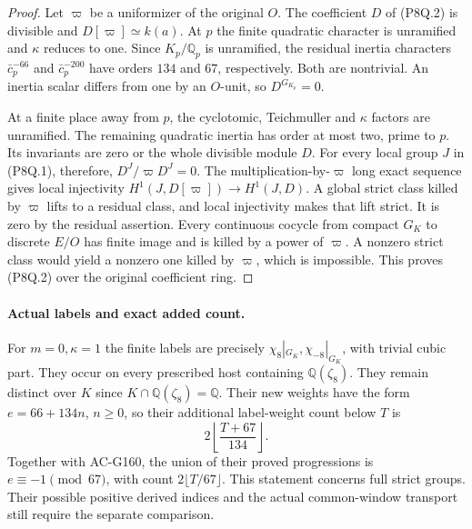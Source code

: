 \begin{proof}
Let $\varpi$ be a uniformizer of the original $O$.
The coefficient $D$ of (P8Q.2) is divisible and
$D[\varpi]\simeq k(a)$.
At $p$ the finite quadratic character is unramified and
$\kappa$ reduces to one.
Since $K_p/\mathbb Q_p$ is unramified, the residual inertia
characters $\bar c_p^{-66}$ and $\bar c_p^{-200}$ have
orders $134$ and $67$, respectively.
Both are nontrivial.
An inertia scalar differs from one by an $O$-unit, so
$D^{G_{K_p}}=0$.

At a finite place away from $p$, the cyclotomic,
Teichmuller and $\kappa$ factors are unramified.
The remaining quadratic inertia has order at most two,
prime to $p$.
Its invariants are zero or the whole divisible module $D$.
For every local group $J$ in (P8Q.1), therefore,
$D^J/\varpi D^J=0$.
The multiplication-by-$\varpi$ long exact sequence gives
local injectivity $H^1(J,D[\varpi])\to H^1(J,D)$.
A global strict class killed by $\varpi$ lifts to a residual
class, and local injectivity makes that lift strict.
It is zero by the residual assertion.
Every continuous cocycle from compact $G_K$ to discrete
$E/O$ has finite image and is killed by a power of $\varpi$.
A nonzero strict class would yield a nonzero one killed
by $\varpi$, which is impossible.
This proves (P8Q.2) over the original coefficient ring.
\end{proof}

\paragraph{Actual labels and exact added count.}
For $m=0,\kappa=1$ the finite labels are precisely
$\chi_8|_{G_K},\chi_{-8}|_{G_K}$, with trivial cubic part.
They occur on every prescribed host containing
$\mathbb Q(\zeta_8)$.
They remain distinct over $K$ since
$K\cap\mathbb Q(\zeta_8)=\mathbb Q$.
Their new weights have the form $e=66+134n$, $n\geq0$,
so their additional label-weight count below $T$ is
\[
                       2\left\lfloor\frac{T+67}{134}\right\rfloor.
 \tag{P8Q.18}
\]
Together with AC-G160, the union of their proved progressions
is $e\equiv-1\pmod{67}$, with count $2\lfloor T/67\rfloor$.
This statement concerns full strict groups.
Their possible positive derived indices and the actual
common-window transport still require the separate comparison.

